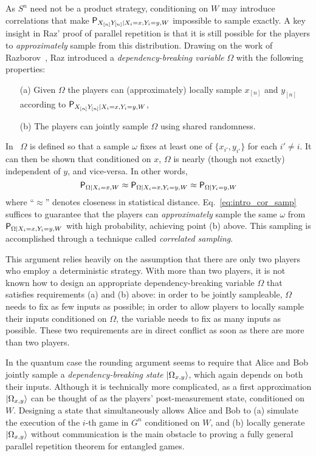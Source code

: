 As $S^n$ need not be a product strategy, conditioning on $W$ may introduce correlations that make $\P_{X_{[n]} Y_{[n]} | X_i = x, Y_i = y,W}$ impossible to sample exactly. A key insight in Raz' proof of parallel repetition is that it is still possible for the players to \emph{approximately} sample from this distribution. 
Drawing on the work of Razborov~\cite{Razborov92}, Raz introduced a \emph{dependency-breaking variable} $\Omega$ with the following properties:
\begin{itemize}
\item[(a)] Given $\Omega$ the players can (approximately) locally sample $x_{[n]}$ and $y_{[n]}$ according to $\P_{X_{[n]} Y_{[n]} | X_i = x, Y_i = y, W}$,
\item[(b)] The players can jointly sample $\Omega$ using shared randomness.
\end{itemize}
In~\cite{Hol09} $\Omega$ is defined so that a sample $\omega$ fixes at least one of $\{x_{i'}, y_{i'}\}$ for each $i' \neq i$. It can then be shown that conditioned on $x$, $\Omega$ is nearly (though not exactly) independent of $y$, and vice-versa. In other words, 
\begin{equation}
\label{eq:intro_cor_samp}
	\P_{\Omega | X_i = x, W} \approx \P_{\Omega | X_i = x, Y_i = y, W} \approx \P_{\Omega | Y_i = y, W}
\end{equation}
where ``$\approx$'' denotes closeness in statistical distance. Eq.~\eqref{eq:intro_cor_samp}  suffices to guarantee that the players can \emph{approximately} sample the same $\omega$ from $\P_{\Omega | X_i = x, Y_i = y, W}$ with high probability, achieving point (b) above. This sampling is accomplished through a technique called \emph{correlated sampling}.

This argument relies heavily on the assumption that there are only two players who employ a deterministic strategy. With more than two players, it is not known how to design an appropriate dependency-breaking variable $\Omega$ that satisfies requirements (a) and (b) above: in order to be jointly sampleable, $\Omega$ needs to fix as few inputs as possible; in order to allow players to locally sample their inputs conditioned on $\Omega$, the variable needs to fix as many inputs as possible. These two requirements are in direct conflict as soon as there are more than two players.

In the quantum case the rounding argument seems to require that Alice and Bob jointly sample a \emph{dependency-breaking state} $\ket{\Omega_{x,y}}$, which again depends on both their inputs. Although it is technically more complicated, as a first approximation $\ket{\Omega_{x,y}}$ can be thought of as the players' post-measurement state, conditioned on $W$. Designing a state that simultaneously allows Alice and Bob to (a) simulate the execution of the $i$-th game in $G^n$ conditioned on $W$, and (b) locally generate $\ket{\Omega_{x,y}}$ without communication is the main obstacle to proving a fully general parallel repetition theorem for entangled games. 

